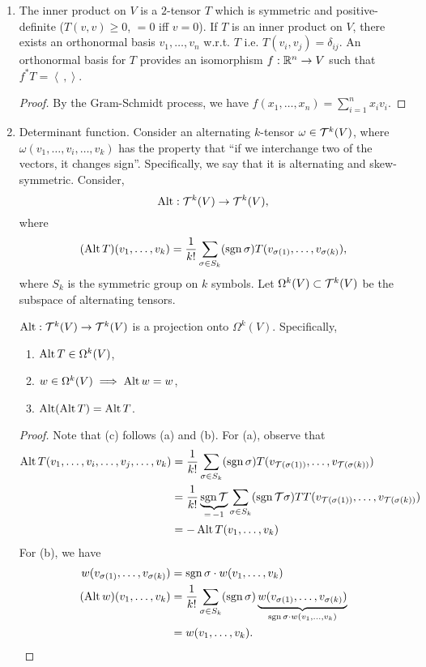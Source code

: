 \begin{enumerate}[label=(\roman*)]
    \item The inner product on $V$ is a $2$-tensor $T$ which is symmetric and positive-definite ($T(v, v) \geq 0$, $= 0$ iff $v = 0$). If $T$ is an inner product on $V$, there exists an orthonormal basis $v_1, \dots, v_n$ w.r.t. $T$ i.e. $T(v_i, v_j) = \delta_{ij}$. An orthonormal basis for $T$ provides an isomorphism $f : \mathbb R^n \to V$ such that $f^\ast T = \left< \, , \right>$.
    \begin{proof}
        By the Gram-Schmidt process, we have $f(x_1, \dots, x_n) = \sum_{i=1}^n x_i v_i$.
    \end{proof}
    \item Determinant function. Consider an alternating $k$-tensor $\omega \in \mathcal T^k(V)$, where $\omega(v_1, \dots, v_i, \dots, v_k)$ has the property that ``if we interchange two of the vectors, it changes sign''. Specifically, we say that it is alternating and skew-symmetric. Consider,
    \[ \operatorname{Alt} : \mathcal T^k(V) \to \mathcal T^k(V), \]
    where
    \[ (\operatorname{Alt} T)(v_1, \dots, v_k) = \frac{1}{k!} \sum_{\sigma \in S_k} (\operatorname{sgn} \sigma) T(v_{\sigma(1)}, \dots, v_{\sigma(k)}), \]
    where $S_k$ is the symmetric group on $k$ symbols. Let $\Omega^k(V) \subset \mathcal T^k(V)$ be the subspace of alternating tensors.
    \begin{simplethm}[Spivak 4-3]
        $\operatorname{Alt} : \mathcal T^k(V) \to \mathcal T^k(V)$ is a projection onto $\Omega^k(V)$. Specifically,
        \begin{enumerate}[label=(\alph*)]
            \item $\operatorname{Alt} T \in \Omega^k(V)$,
            \item $w \in \Omega^k(V) \implies \operatorname{Alt} w = w$,
            \item $\operatorname{Alt}(\operatorname{Alt} T) = \operatorname{Alt} T$.
        \end{enumerate}
    \end{simplethm}
    \begin{proof}
        Note that (c) follows (a) and (b). For (a), observe that
        \begin{align*}
            \operatorname{Alt} T(v_1, \dots, v_i, \dots, v_j, \dots, v_k) &= \frac{1}{k!} \sum_{\sigma \in S_k} (\operatorname{sgn} \sigma) T(v_{\mathcal T(\sigma(1))}, \dots, v_{\mathcal T(\sigma(k))}) \\
            &= \frac{1}{k!} \underbrace{\operatorname{sgn} \mathcal T}_{= \, -1} \sum_{\sigma \in S_k} (\operatorname{sgn} \mathcal T \sigma) TT(v_{\mathcal T(\sigma(1))}, \dots, v_{\mathcal T(\sigma(k))}) \\
            &= - \operatorname{Alt} T(v_1, \dots, v_k)
        \end{align*}
        For (b), we have
        \begin{align*}
            w(v_{\sigma(1)}, \dots, v_{\sigma(k)}) &= \operatorname{sgn} \sigma \cdot w(v_1, \dots, v_k) \\
            (\operatorname{Alt} w)(v_1, \dots, v_k) &= \frac{1}{k!} \sum_{\sigma \in S_k} (\operatorname{sgn} \sigma) \underbrace{w(v_{\sigma(1)}, \dots, v_{\sigma(k)})}_{\operatorname{sgn} \sigma \cdot w(v_1, \dots, v_k)} \\
            &= w(v_1, \dots, v_k). \qedhere
        \end{align*}
    \end{proof}
\end{enumerate}